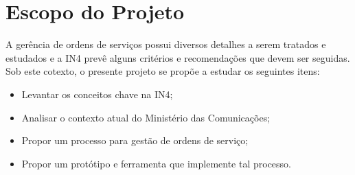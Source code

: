 \section{Escopo do Projeto}

A gerência de ordens de serviços possui diversos detalhes a serem tratados e
estudados e a IN4 prevê alguns critérios e recomendações que devem ser seguidas.
Sob este cotexto, o presente projeto se propõe a estudar os seguintes itens:

\begin{itemize}
  \item Levantar os conceitos chave na IN4;
  \item Analisar o contexto atual do Ministério das Comunicações;
  \item Propor um processo para gestão de ordens de serviço;
  \item Propor um protótipo e ferramenta que implemente tal processo.
\end{itemize}
